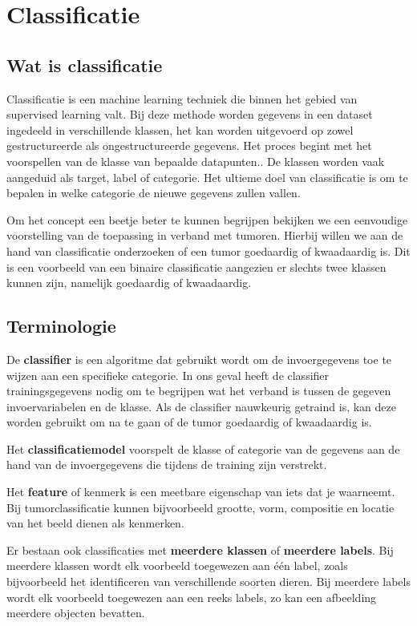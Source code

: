 \documentclass[TeamE-eindrapport]{subfiles}
\begin{document}
	
	\chapter{Classificatie}
	
	\section{Wat is classificatie}
	
	Classificatie is een machine learning techniek die binnen het gebied van supervised learning valt. Bij deze methode worden gegevens in een dataset ingedeeld in verschillende klassen, het kan worden uitgevoerd op zowel gestructureerde als ongestructureerde gegevens. Het proces begint met het voorspellen van de klasse van bepaalde datapunten.. De klassen worden vaak aangeduid als target, label of categorie. Het ultieme doel van classificatie is om te bepalen in welke categorie de nieuwe gegevens zullen vallen.
	
	Om het concept een beetje beter te kunnen begrijpen bekijken we een eenvoudige voorstelling van de toepassing in verband met tumoren. Hierbij willen we aan de hand van classificatie onderzoeken of een tumor goedaardig of kwaadaardig is. Dit is een voorbeeld van een binaire classificatie aangezien er slechts twee klassen kunnen zijn, namelijk goedaardig of kwaadaardig.
	
	
	\section{Terminologie}
	
	De \textbf{classifier} is een algoritme dat gebruikt wordt om de invoergegevens toe te wijzen aan een specifieke categorie. In ons geval heeft de classifier trainingsgegevens nodig om te begrijpen wat het verband is tussen de gegeven invoervariabelen en de klasse. Als de classifier nauwkeurig getraind is, kan deze worden gebruikt om na te gaan of de tumor goedaardig of kwaadaardig is.
	
	Het \textbf{classificatiemodel} voorspelt de klasse of categorie van de gegevens aan de hand van de invoergegevens die tijdens de training zijn verstrekt.
	
	Het \textbf{feature} of kenmerk is een meetbare eigenschap van iets dat je waarneemt. Bij tumorclassificatie kunnen bijvoorbeeld grootte, vorm, compositie en locatie van het beeld dienen als kenmerken.
	
	Er bestaan ook classificaties met \textbf{meerdere klassen} of \textbf{meerdere labels}. Bij meerdere klassen wordt elk voorbeeld toegewezen aan één label, zoals bijvoorbeeld het identificeren van verschillende soorten dieren.  Bij meerdere labels wordt elk voorbeeld toegewezen aan een reeks labels, zo kan een afbeelding meerdere objecten bevatten.
	
\end{document}
